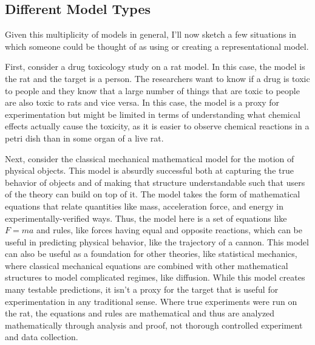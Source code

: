 \hypertarget{different-model-types}{%
\subsection{Different Model Types}\label{different-model-types}}

Given this multiplicity of models in general, I'll now sketch a few
situations in which someone could be thought of as using or creating a
representational model.

First, consider a drug toxicology study on a rat model. In this case,
the model is the rat and the target is a person. The researchers want to
know if a drug is toxic to people and they know that a large number of
things that are toxic to people are also toxic to rats and vice versa.
In this case, the model is a proxy for experimentation but might be
limited in terms of understanding what chemical effects actually cause
the toxicity, as it is easier to observe chemical reactions in a petri
dish than in some organ of a live rat.

Next, consider the classical mechanical mathematical model for the
motion of physical objects. This model is absurdly successful both at
capturing the true behavior of objects and of making that structure
understandable such that users of the theory can build on top of it. The
model takes the form of mathematical equations that relate quantities
like mass, acceleration force, and energy in experimentally-verified
ways. Thus, the model here is a set of equations like \(F=ma\) and
rules, like forces having equal and opposite reactions, which can be
useful in predicting physical behavior, like the trajectory of a cannon.
This model can also be useful as a foundation for other theories, like
statistical mechanics, where classical mechanical equations are combined
with other mathematical structures to model complicated regimes, like
diffusion. While this model creates many testable predictions, it isn't
a proxy for the target that is useful for experimentation in any
traditional sense. Where true experiments were run on the rat, the
equations and rules are mathematical and thus are analyzed
mathematically through analysis and proof, not thorough controlled
experiment and data collection.

